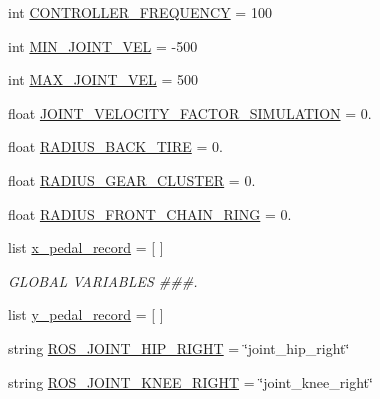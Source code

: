 \begin{DoxyCompactItemize}
\item 
int \mbox{\hyperlink{namespacepedal__simulation__interpolation__lennard_a3dc653f4494bf666747154ef6d41fe09}{C\+O\+N\+T\+R\+O\+L\+L\+E\+R\+\_\+\+F\+R\+E\+Q\+U\+E\+N\+CY}} = 100
\item 
int \mbox{\hyperlink{namespacepedal__simulation__interpolation__lennard_a23c9a41e8cd6ba432e224e78b54c2ad4}{M\+I\+N\+\_\+\+J\+O\+I\+N\+T\+\_\+\+V\+EL}} = -\/500
\item 
int \mbox{\hyperlink{namespacepedal__simulation__interpolation__lennard_abb0c0d5561e6ed808735e3e85e0ee8ef}{M\+A\+X\+\_\+\+J\+O\+I\+N\+T\+\_\+\+V\+EL}} = 500
\item 
float \mbox{\hyperlink{namespacepedal__simulation__interpolation__lennard_aa36089b7b0103a5a7b8dd3570ad0ee3e}{J\+O\+I\+N\+T\+\_\+\+V\+E\+L\+O\+C\+I\+T\+Y\+\_\+\+F\+A\+C\+T\+O\+R\+\_\+\+S\+I\+M\+U\+L\+A\+T\+I\+ON}} = 0.
\item 
float \mbox{\hyperlink{namespacepedal__simulation__interpolation__lennard_a7a14a8b1a741fe9dc6a44b47532e367a}{R\+A\+D\+I\+U\+S\+\_\+\+B\+A\+C\+K\+\_\+\+T\+I\+RE}} = 0.
\item 
float \mbox{\hyperlink{namespacepedal__simulation__interpolation__lennard_a31df4b32bc9250de987071c6646012b3}{R\+A\+D\+I\+U\+S\+\_\+\+G\+E\+A\+R\+\_\+\+C\+L\+U\+S\+T\+ER}} = 0.
\item 
float \mbox{\hyperlink{namespacepedal__simulation__interpolation__lennard_a73f512d5393e7ce24f56d7ae8fbee327}{R\+A\+D\+I\+U\+S\+\_\+\+F\+R\+O\+N\+T\+\_\+\+C\+H\+A\+I\+N\+\_\+\+R\+I\+NG}} = 0.
\item 
list \mbox{\hyperlink{namespacepedal__simulation__interpolation__lennard_a935ec90688f7591231c1c912505f3920}{x\+\_\+pedal\+\_\+record}} = \mbox{[} \mbox{]}
\begin{DoxyCompactList}\small\item\em G\+L\+O\+B\+AL V\+A\+R\+I\+A\+B\+L\+ES \#\#\#. \end{DoxyCompactList}\item 
list \mbox{\hyperlink{namespacepedal__simulation__interpolation__lennard_a913a3917b0dbb27dd06be35dd53988df}{y\+\_\+pedal\+\_\+record}} = \mbox{[} \mbox{]}
\item 
string \mbox{\hyperlink{namespacepedal__simulation__interpolation__lennard_a74794ac4c06fcaf11b8a60fedb031366}{R\+O\+S\+\_\+\+J\+O\+I\+N\+T\+\_\+\+H\+I\+P\+\_\+\+R\+I\+G\+HT}} = \char`\"{}joint\+\_\+hip\+\_\+right\char`\"{}
\item 
string \mbox{\hyperlink{namespacepedal__simulation__interpolation__lennard_a712b495356e02e1515787228bb85c81f}{R\+O\+S\+\_\+\+J\+O\+I\+N\+T\+\_\+\+K\+N\+E\+E\+\_\+\+R\+I\+G\+HT}} = \char`\"{}joint\+\_\+knee\+\_\+right\char`\"{}

\end{DoxyCompactItemize}
